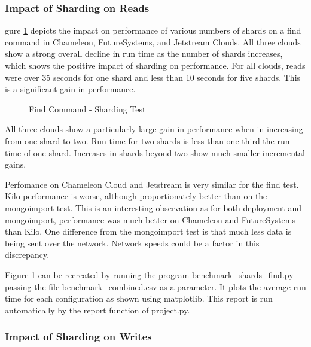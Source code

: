 \documentclass[9pt,twocolumn,twoside]{../../styles/osajnl}
\begin{document}
\subsubsection{Impact of Sharding on Reads}


gure \ref{fig:shard-find} depicts the impact on performance of various
numbers of shards on a find command in Chameleon, FutureSystems, and
Jetstream Clouds. All three clouds show a strong overall decline in
run time as the number of shards increases, which shows the positive
impact of sharding on performance. For all clouds, reads were over 35
seconds for one shard and less than 10 seconds for five shards. This
is a significant gain in performance.

\begin{figure}[htbp]
\centering
{}
\caption{Find Command - Sharding Test}
\label{fig:shard-find}
\end{figure}


All three clouds show a particularly large gain in performance when in
increasing from one shard to two. Run time for two shards is less than
one third the run time of one shard. Increases in shards beyond two
show much smaller incremental gains.

Perfomance on Chameleon Cloud and Jetstream is very similar for the
find test. Kilo performance is worse, although proportionately better
than on the mongoimport test. This is an interesting observation as
for both deployment and mongoimport, performance was much better on
Chameleon and FutureSystems than Kilo. One difference from the
mongoimport test is that much less data is being sent over the
network. Network speeds could be a factor in this discrepancy.

Figure \ref{fig:shard-find} can be recreated by running the program
benchmark\_shards\_find.py passing the file benchmark\_combined.csv as
a parameter. It plots the average run time for each configuration as
shown using matplotlib. This report is run automatically by the report
function of project.py.




\subsubsection{Impact of Sharding on Writes}
\end{document}
